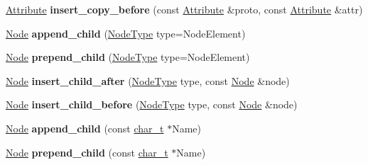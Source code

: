 \begin{DoxyCompactItemize}
\item 
\hypertarget{classphys_1_1xml_1_1Node_af4b5824124e70eda957c410e66123896}{
\hyperlink{classphys_1_1xml_1_1Attribute}{Attribute} {\bfseries insert\_\-copy\_\-before} (const \hyperlink{classphys_1_1xml_1_1Attribute}{Attribute} \&proto, const \hyperlink{classphys_1_1xml_1_1Attribute}{Attribute} \&attr)}
\label{d7/d0a/classphys_1_1xml_1_1Node_af4b5824124e70eda957c410e66123896}

\item 
\hypertarget{classphys_1_1xml_1_1Node_af2601376ae30b9744b3b10067d26de9a}{
\hyperlink{classphys_1_1xml_1_1Node}{Node} {\bfseries append\_\-child} (\hyperlink{namespacephys_1_1xml_a668b0cc666a9d49f7c7222a7552115d3}{NodeType} type=NodeElement)}
\label{d7/d0a/classphys_1_1xml_1_1Node_af2601376ae30b9744b3b10067d26de9a}

\item 
\hypertarget{classphys_1_1xml_1_1Node_ae34bde1d0157fe19996c26099a22695c}{
\hyperlink{classphys_1_1xml_1_1Node}{Node} {\bfseries prepend\_\-child} (\hyperlink{namespacephys_1_1xml_a668b0cc666a9d49f7c7222a7552115d3}{NodeType} type=NodeElement)}
\label{d7/d0a/classphys_1_1xml_1_1Node_ae34bde1d0157fe19996c26099a22695c}

\item 
\hypertarget{classphys_1_1xml_1_1Node_a6c6b4225db38e4f031ee68d5c8c86377}{
\hyperlink{classphys_1_1xml_1_1Node}{Node} {\bfseries insert\_\-child\_\-after} (\hyperlink{namespacephys_1_1xml_a668b0cc666a9d49f7c7222a7552115d3}{NodeType} type, const \hyperlink{classphys_1_1xml_1_1Node}{Node} \&node)}
\label{d7/d0a/classphys_1_1xml_1_1Node_a6c6b4225db38e4f031ee68d5c8c86377}

\item 
\hypertarget{classphys_1_1xml_1_1Node_a36dd60f74bcf0ac054169c3c6ae8e286}{
\hyperlink{classphys_1_1xml_1_1Node}{Node} {\bfseries insert\_\-child\_\-before} (\hyperlink{namespacephys_1_1xml_a668b0cc666a9d49f7c7222a7552115d3}{NodeType} type, const \hyperlink{classphys_1_1xml_1_1Node}{Node} \&node)}
\label{d7/d0a/classphys_1_1xml_1_1Node_a36dd60f74bcf0ac054169c3c6ae8e286}

\item 
\hypertarget{classphys_1_1xml_1_1Node_ad677dbf1c4a38d15b03b0ae2269cdcdb}{
\hyperlink{classphys_1_1xml_1_1Node}{Node} {\bfseries append\_\-child} (const \hyperlink{namespacephys_1_1xml_afc87705cd1c2917d87b879715a2d8f6e}{char\_\-t} $\ast$Name)}
\label{d7/d0a/classphys_1_1xml_1_1Node_ad677dbf1c4a38d15b03b0ae2269cdcdb}

\item 
\hypertarget{classphys_1_1xml_1_1Node_a20b4aa3acdd90003205e7817518fa2d7}{
\hyperlink{classphys_1_1xml_1_1Node}{Node} {\bfseries prepend\_\-child} (const \hyperlink{namespacephys_1_1xml_afc87705cd1c2917d87b879715a2d8f6e}{char\_\-t} $\ast$Name)}
\label{d7/d0a/classphys_1_1xml_1_1Node_a20b4aa3acdd90003205e7817518fa2d7}


\end{DoxyCompactItemize}
